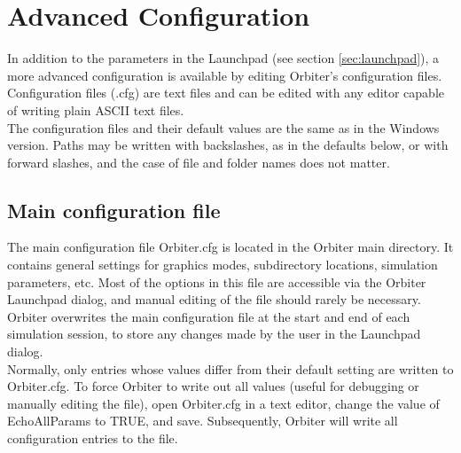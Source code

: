 \documentclass[Orbiter User Manual.tex]{subfiles}
\begin{document}
\section{Advanced Configuration}
In addition to the parameters in the Launchpad (see section \ref{sec:launchpad}), a more advanced configuration is available by editing Orbiter's configuration files. Configuration files (.cfg) are text files and can be edited with any editor capable of writing plain ASCII text files.\\
The configuration files and their default values are the same as in the Windows version. Paths may be written with backslashes, as in the defaults below, or with forward slashes, and the case of file and folder names does not matter.


\subsection{Main configuration file}
The main configuration file Orbiter.cfg is located in the Orbiter main directory. It contains general settings for graphics modes, subdirectory locations, simulation parameters, etc. Most of the options in this file are accessible via the Orbiter Launchpad dialog, and manual editing of the file should rarely be necessary.\\
Orbiter overwrites the main configuration file at the start and end of each simulation session, to store any changes made by the user in the Launchpad dialog.\\
Normally, only entries whose values differ from their default setting are written to Orbiter.cfg. To force Orbiter to write out all values (useful for debugging or manually editing the file), open Orbiter.cfg in a text editor, change the value of EchoAllParams to TRUE, and save. Subsequently, Orbiter will write all configuration entries to the file.
\end{document}
